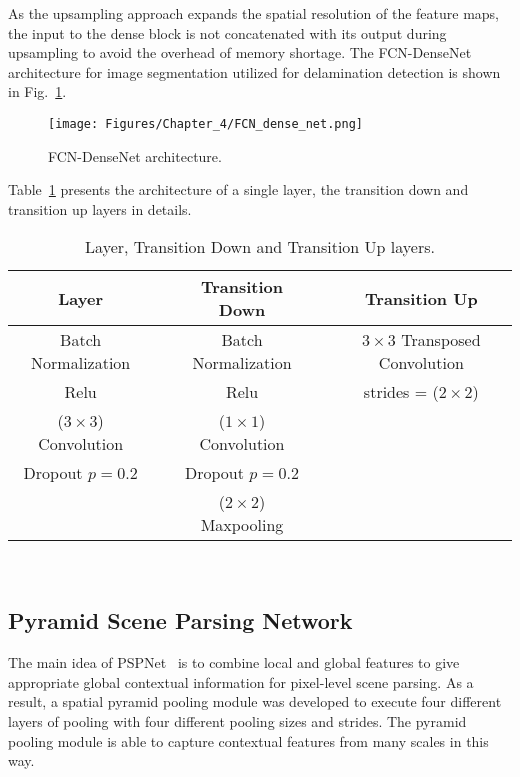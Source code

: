 As the upsampling approach expands the spatial resolution of the feature maps, the input to the dense block is not concatenated with its output during upsampling to avoid the overhead of memory shortage.
The FCN-DenseNet architecture for image segmentation utilized for delamination detection is shown in Fig.~\ref{fcn}.
\begin{figure} [h!]
	\begin{center}
		\texttt{[image: Figures/Chapter\_4/FCN\_dense\_net.png]}
	\end{center}
	\caption{FCN-DenseNet architecture.} 
	\label{fcn}
\end{figure}
Table~\ref{layers} presents the architecture of a single layer, the transition down and transition up layers in details.
\begin{table}[h!]
	\renewcommand{\arraystretch}{1.3}
	\centering
	\scriptsize
	\resizebox{\textwidth}{!}
	{
		\begin{tabular}{ccccc}
			\hline
			Layer & & Transition Down & & Transition Up \\ 
			\hline
			Batch Normalization & & Batch Normalization & & \(3\times 3\) Transposed Convolution \\ 
			Relu & & Relu & & strides = (\(2\times2\)) \\ 
			(\(3\times3\)) Convolution & & (\(1\times1\)) Convolution & & \\ 
			Dropout \(p=0.2\) & &Dropout \(p=0.2\) & & \\ 
			& & (\(2\times2\)) Maxpooling & & \\ 
			\hline
		\end{tabular}
	}
	\caption{Layer, Transition Down and Transition Up layers.} 
	\label{layers}	
\end{table}\\
\subsection{Pyramid Scene Parsing Network}
The main idea of PSPNet~\cite{zhao2017pyramid} is to combine local and global features to give appropriate global contextual information for pixel-level scene parsing.
As a result, a spatial pyramid pooling module was developed to execute four different layers of pooling with four different pooling sizes and strides.
The pyramid pooling module is able to capture contextual features from many scales in this way.

